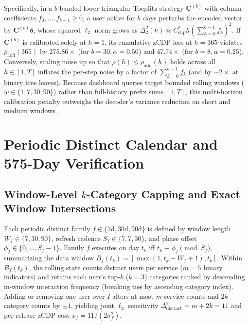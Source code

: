 \documentclass[sigconf, nonacm]{acmart}
\begin{document}
Specifically, in a $b$-banded lower-triangular Toeplitz strategy $\mathbf{C}^{(b)}$ with column coefficients $f_0, \dots, f_{b-1} \ge 0$, a user active for $h$ days perturbs the encoded vector by $\mathbf{C}^{(b)}\boldsymbol{\delta}$, whose squared $\ell_2$ norm grows as $\Delta_2^2(h) \approx C_{\mathrm{clip}}^2 h (\sum_{k=0}^{b-1} f_k)^2$. If $\mathbf{C}^{(b)}$ is calibrated solely at $h=1$, its cumulative zCDP loss at $h=365$ violates $\bar{\rho}_{\mathrm{add}}(365)$ by $275.86\times$ (for $b=30, \alpha=0.50$) and $47.74\times$ (for $b=8, \alpha=0.25$). Conversely, scaling noise up so that $\rho(h) \le \bar{\rho}_{\mathrm{add}}(h)$ holds across all $h \in [1, T]$ inflates the per-step noise by a factor of $\sum_{k=0}^{b-1} f_k$ (and by $\sim 2\times$ at binary tree leaves). Because dashboard queries target bounded rolling windows ($w \in \{1, 7, 30, 90\}$) rather than full-history prefix sums $[1, T]$, this multi-horizon calibration penalty outweighs the decoder's variance reduction on short and medium windows.

\section{Periodic Distinct Calendar and 575-Day Verification}
\label{sec:calendar}

\subsection{Window-Level $k$-Category Capping and Exact Window Intersections}
Each periodic distinct family $f \in \{7\text{d}, 30\text{d}, 90\text{d}\}$ is defined by window length $W_f \in \{7, 30, 90\}$, refresh cadence $S_f \in \{7, 7, 30\}$, and phase offset $\phi_f \in \{0, \dots, S_f - 1\}$. Family $f$ executes on day $t_k$ iff $t_k \equiv \phi_f \pmod{S_f}$, summarizing the data window $B_f(t_k) = [\max(1, t_k - W_f + 1), t_k]$. Within $B_f(t_k)$, the rolling state counts distinct users per service ($m=5$ binary indicators) and retains each user's top-$k$ ($k=3$) categories ranked by descending in-window interaction frequency (breaking ties by ascending category index). Adding or removing one user over $I$ alters at most $m$ service counts and $2k$ category counts by $\pm 1$, yielding joint $\ell_2$ sensitivity $\Delta_{\mathrm{distinct}}^2 = m + 2k = 11$ and per-release zCDP cost $x_f = 11 / (2\sigma_f^2)$.
\end{document}
